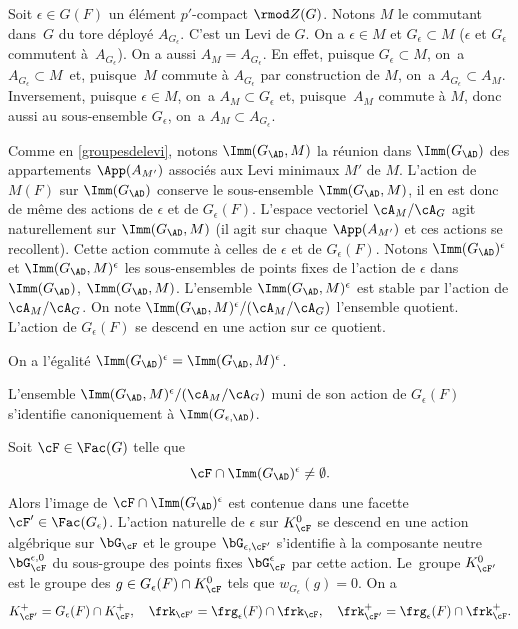\label{pointsfixes}
Soit $\epsilon \in G(F)$ un élément $p'$-compact $\rmod Z(G)$. Notons $M$ le commutant dans~$G$ du tore déployé $A_{G_{\epsilon}}$. C'est un Levi de $G$. On a $\epsilon\in M$ et $G_{\epsilon}\subset M$ ($\epsilon$ et $G_{\epsilon}$ commutent à~$A_{G_{\epsilon}}$). On a aussi $A_{M}=A_{G_{\epsilon}}$. En effet, puisque $G_{\epsilon}\subset M$, on~a $ A_{G_{\epsilon}}\subset M$~et, puisque~$M$ commute à $A_{G_{\epsilon}}$ par construction de $M$, on~a $A_{G_{\epsilon}}\subset A_{M}$. Inversement, puisque $\epsilon\in M$, on~a $A_{M}\subset G_{\epsilon}$ et, puisque~$A_{M}$ commute à $M$, donc aussi au sous-ensemble $G_{\epsilon}$, on~a $A_{M}\subset A_{G_{\epsilon}}$.

Comme en \ref{groupesdelevi}, notons $\Imm(G_{\AD},M)$ la réunion dans $\Imm(G_{\AD})$ des appartements $\App(A_{M'})$ associés aux Levi minimaux $M'$ de $M$. L'action de $M(F)$ sur $\Imm(G_{\AD})$ conserve le sous-ensemble $\Imm(G_{\AD},M)$, il en est donc de même des actions de $\epsilon$ et de $G_{\epsilon}(F)$. L'espace vectoriel $\cA_{M} /\cA_{G}$ agit naturellement sur $\Imm(G_{\AD},M)$ (il agit sur chaque $\App(A_{M'})$ et ces actions se recollent). Cette action commute à celles de $\epsilon$ et de $G_{\epsilon}(F)$. Notons $\Imm(G_{\AD})^{\epsilon}$ et $\Imm(G_{\AD},M)^{\epsilon}$ les sous-ensembles de points fixes de l'action de $\epsilon$ dans $\Imm(G_{\AD})$, \resp $\Imm(G_{\AD},M)$. L'ensemble $\Imm(G_{\AD},M)^{\epsilon}$ est stable par l'action de $\cA_{M}/\cA_{G}$. On note $\Imm(G_{\AD},M)^{\epsilon}/(\cA_{M}/\cA_{G})$ l'ensemble quotient. L'action de $G_{\epsilon}(F)$ se descend en une action sur ce quotient.

\skpt
\begin{prop*}
\begin{enumeratei}
\item\label{pointsfixesi}
On a l'égalité $\Imm(G_{\AD})^{\epsilon}=\Imm(G_{\AD},M)^{\epsilon}$.

\item\label{pointsfixesii}
L'ensemble $\Imm(G_{\AD},M)^{\epsilon}/(\cA_{M}/\cA_{G})$ muni de son action de $G_{\epsilon}(F)$ s'identifie canoniquement à $\Imm(G_{\epsilon,\AD})$.

\item\label{pointsfixesiii}
Soit $\cF\in \Fac(G)$ telle que
\[
\cF\cap \Imm(G_{\AD})^{\epsilon}\neq\emptyset.
\]
Alors l'image de $\cF\cap \Imm(G_{\AD})^{\epsilon}$ est contenue dans une facette $\cF'\in \Fac(G_{\epsilon})$. L'action naturelle de $\epsilon$ sur $K_{\cF}^0$ se descend en une action algébrique sur $\bG_{\cF}$ et le groupe $\bG_{\epsilon,\cF'}$ s'identifie à la composante neutre $\bG_{\cF}^{\epsilon,0}$ du sous-groupe des points fixes $\bG_{\cF}^{\epsilon}$ par cette action. Le~groupe $K_{\cF'}^0$ est le groupe des $g\in G_{\epsilon}(F)\cap K_{\cF}^0$ tels que $w_{G_{\epsilon}}(g)=0$. On a
\[
K_{\cF'}^+=G_{\epsilon}(F)\cap K_{\cF}^+,\quad \frk_{\cF'}=\frg_{\epsilon}(F)\cap \frk_{\cF},\quad \frk_{\cF'}^+=\frg_{\epsilon}(F)\cap \frk_{\cF}^+.
\]
\end{enumeratei}
\end{prop*}

